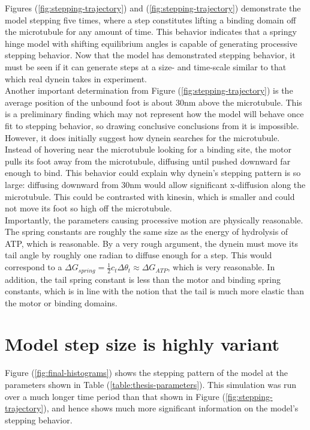 \documentclass[
11pt, %
english, %
singlespacing, %
headsepline, %
chapterinoneline, %
]{MastersDoctoralThesis} %
\begin{document}
Figures (\ref{fig:stepping-trajectory}) and (\ref{fig:stepping-trajectory}) demonstrate the model stepping five times, where a step constitutes lifting a binding domain off the microtubule for any amount of time. This behavior indicates that a springy hinge model with shifting equilibrium angles is capable of generating processive stepping behavior. Now that the model has demonstrated stepping behavior, it must be seen if it can generate steps at a size- and time-scale similar to that which real dynein takes in experiment.\\

Another important determination from Figure (\ref{fig:stepping-trajectory}) is the average position of the unbound foot is about 30nm above the microtubule. This is a preliminary finding which may not represent how the model will behave once fit to stepping behavior, so drawing conclusive conclusions from it is impossible. However, it does initially suggest how dynein searches for the microtubule. Instead of hovering near the microtubule looking for a binding site, the motor pulls its foot away from the microtubule, diffusing until pushed downward far enough to bind. This behavior could explain why dynein's stepping pattern is so large: diffusing downward from 30nm would allow significant x-diffusion along the microtubule. This could be contrasted with kinesin, which is smaller and could not move its foot so high off the microtubule.\\

Importantly, the parameters causing processive motion are physically reasonable. The spring constants are roughly the same size as the energy of hydrolysis of ATP, which is reasonable. By a very rough argument, the dynein must move its tail angle by roughly one radian to diffuse enough for a step. This would correspond to a $\Delta G_{spring} = \frac{1}{2}c_t\Delta \theta_t \approx \Delta G_{ATP}$, which is very reasonable. In addition, the tail spring constant is less than the motor and binding spring constants, which is in line with the notion that the tail is much more elastic than the motor or binding domains.\\

\section{Model step size is highly variant}
Figure (\ref{fig:final-histograms}) shows the stepping pattern of the model at the parameters shown in Table (\ref{table:thesis-parameters}). This simulation was run over a much longer time period than that shown in Figure (\ref{fig:stepping-trajectory}), and hence shows much more significant information on the model's stepping behavior.\\
\end{document}
